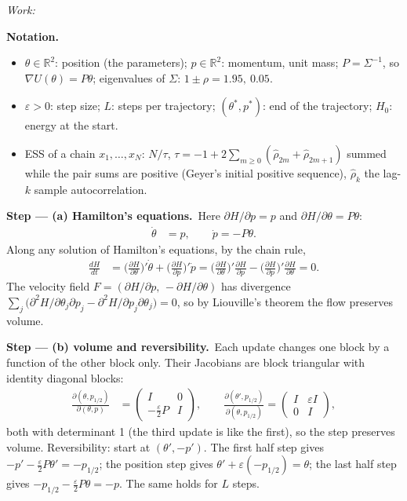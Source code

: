\documentclass[11pt,a4paper]{article}
\newif\ifsolucoes
\newcommand{\espacoresol}{4.5cm}   %
\newenvironment{notacao}{\par\smallskip\noindent\textbf{Notation.}\begin{itemize}[leftmargin=1.4em,topsep=1pt,itemsep=0pt]\small}{\end{itemize}}
\newcommand{\resolespaco}{\ifsolucoes\else\par\textit{Work:}\vspace{\espacoresol}\par\fi}
\newcommand{\passo}[2]{\par\smallskip\noindent\textbf{Step --- #1.}~#2}
\begin{document}
\resolespaco
\begin{sol}
\begin{notacao}
\item $\theta\in\mathbb R^2$: position (the parameters); $p\in\mathbb R^2$: momentum, unit mass; $P=\Sigma^{-1}$, so $\nabla U(\theta)=P\theta$; eigenvalues of $\Sigma$: $1\pm\rho=1.95,\ 0.05$.
\item $\varepsilon>0$: step size; $L$: steps per trajectory; $(\theta^*,p^*)$: end of the trajectory; $H_0$: energy at the start.
\item ESS of a chain $x_1,\ldots,x_N$: $N/\tau$, $\tau=-1+2\sum_{m\ge0}(\hat\rho_{2m}+\hat\rho_{2m+1})$ summed while the pair sums are positive (Geyer's initial positive sequence), $\hat\rho_k$ the lag-$k$ sample autocorrelation.
\end{notacao}
\passo{(a) Hamilton's equations}{Here $\partial H/\partial p=p$ and $\partial H/\partial\theta=P\theta$:
\begin{align}
\dot\theta&=p,\qquad\dot p=-P\theta.\label{o2:ham}
\end{align}
Along any solution of Hamilton's equations, by the chain rule,
\begin{align}
\frac{dH}{dt}&=\Big(\frac{\partial H}{\partial\theta}\Big)'\dot\theta+\Big(\frac{\partial H}{\partial p}\Big)'\dot p=\Big(\frac{\partial H}{\partial\theta}\Big)'\frac{\partial H}{\partial p}-\Big(\frac{\partial H}{\partial p}\Big)'\frac{\partial H}{\partial\theta}=0.\label{o2:cons}
\end{align}
The velocity field $F=(\partial H/\partial p,\,-\partial H/\partial\theta)$ has divergence $\sum_j\big(\partial^2H/\partial\theta_j\partial p_j-\partial^2H/\partial p_j\partial\theta_j\big)=0$, so by Liouville's theorem the flow preserves volume.}
\passo{(b) volume and reversibility}{Each update changes one block by a function of the other block only. Their Jacobians are block triangular with identity diagonal blocks:
\begin{align}
\frac{\partial(\theta,p_{1/2})}{\partial(\theta,p)}&=\begin{pmatrix}I&0\\-\frac\varepsilon2P&I\end{pmatrix},\qquad
\frac{\partial(\theta',p_{1/2})}{\partial(\theta,p_{1/2})}=\begin{pmatrix}I&\varepsilon I\\0&I\end{pmatrix},\label{o2:jac}
\end{align}
both with determinant 1 (the third update is like the first), so the step preserves volume. Reversibility: start at $(\theta',-p')$. The first half step gives $-p'-\frac\varepsilon2P\theta'=-p_{1/2}$; the position step gives $\theta'+\varepsilon(-p_{1/2})=\theta$; the last half step gives $-p_{1/2}-\frac\varepsilon2P\theta=-p$. The same holds for $L$ steps.}

\end{sol}
\end{document}
